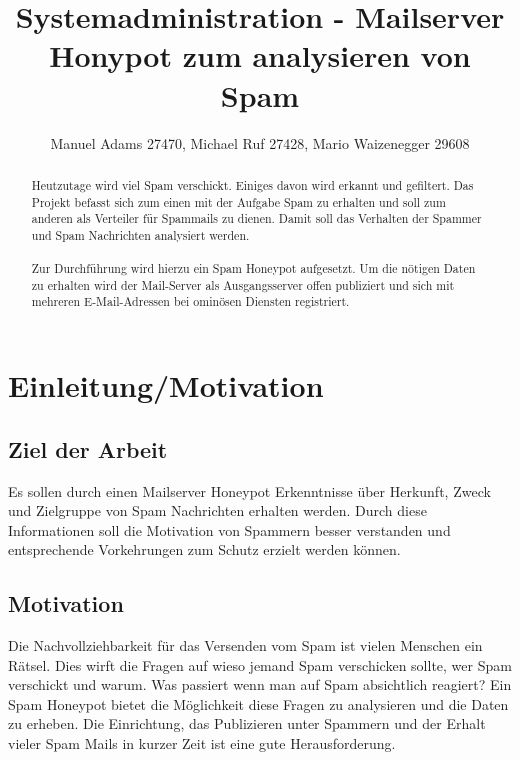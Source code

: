 \documentclass[a4paper,11pt,singlespacing]{article}
\begin{document}

\title{Systemadministration - Mailserver Honypot zum analysieren von Spam}
\author{Manuel Adams 27470, Michael Ruf 27428, Mario Waizenegger 29608}
\maketitle
\begin{abstract}
Heutzutage wird viel Spam verschickt. Einiges davon wird erkannt und gefiltert.
Das Projekt befasst sich zum einen mit der Aufgabe Spam zu erhalten und soll zum anderen als Verteiler für Spammails zu dienen.
Damit soll das Verhalten der Spammer und Spam Nachrichten analysiert werden.
\\\\
Zur Durchführung wird hierzu ein Spam Honeypot aufgesetzt.
Um die nötigen Daten zu erhalten wird der Mail-Server als Ausgangsserver offen publiziert und sich mit mehreren E-Mail-Adressen bei ominösen Diensten registriert.
\end{abstract}

\newpage

\tableofcontents

\newpage
{}

\section{Einleitung/Motivation}\label{sec:Einleitung}

	\subsection{Ziel der Arbeit}\label{sec:EinleitungZiel}
		Es sollen durch einen Mailserver Honeypot Erkenntnisse über Herkunft, Zweck und Zielgruppe von Spam Nachrichten erhalten werden.
		Durch diese Informationen soll die Motivation von Spammern besser verstanden und entsprechende Vorkehrungen zum Schutz erzielt werden können.

	\subsection{Motivation}\label{sec:EinleitungMotivation}
		Die Nachvollziehbarkeit für das Versenden vom Spam ist vielen Menschen ein Rätsel.
		Dies wirft die Fragen auf wieso jemand Spam verschicken sollte, wer Spam verschickt und warum.
		Was passiert wenn man auf Spam absichtlich reagiert?
		Ein Spam Honeypot bietet die Möglichkeit diese Fragen zu analysieren und die Daten zu erheben.
		Die Einrichtung, das Publizieren unter Spammern und der Erhalt vieler Spam Mails in kurzer Zeit ist eine gute Herausforderung.
	
\end{document}
